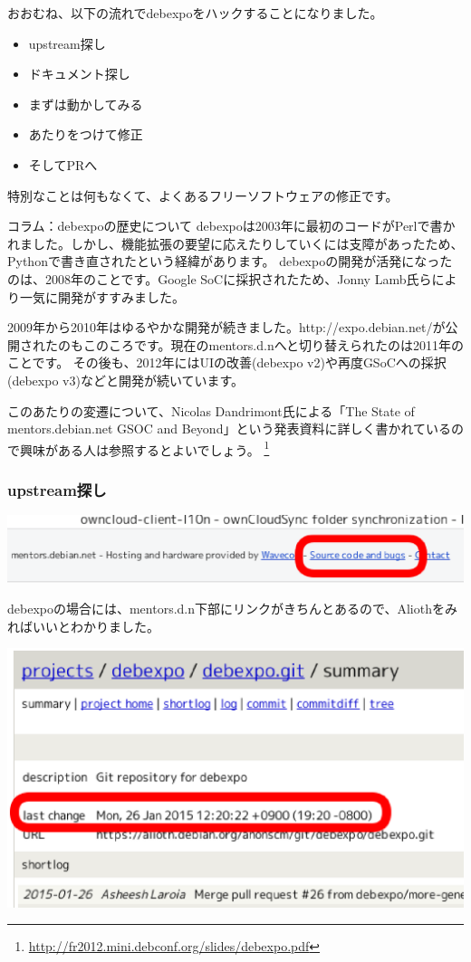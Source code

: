 \documentclass[mingoth,a4paper]{jsarticle}
\begin{document}
おおむね、以下の流れでdebexpoをハックすることになりました。

\begin{itemize}
  \item upstream探し
  \item ドキュメント探し
  \item まずは動かしてみる
  \item あたりをつけて修正
  \item そしてPRへ
\end{itemize}

特別なことは何もなくて、よくあるフリーソフトウェアの修正です。

\begin{itembox}[l]{コラム：debexpoの歴史について}
debexpoは2003年に最初のコードがPerlで書かれました。しかし、機能拡張の要望に応えたりしていくには支障があったため、Pythonで書き直されたという経緯があります。
debexpoの開発が活発になったのは、2008年のことです。Google SoCに採択されたため、Jonny Lamb氏らにより一気に開発がすすみました。

2009年から2010年はゆるやかな開発が続きました。http://expo.debian.net/が公開されたのもこのころです。現在のmentors.d.nへと切り替えられたのは2011年のことです。
その後も、2012年にはUIの改善(debexpo v2)や再度GSoCへの採択(debexpo v3)などと開発が続いています。

このあたりの変遷について、Nicolas Dandrimont氏による「The State of mentors.debian.net GSOC and Beyond」という発表資料に詳しく書かれているので興味がある人は参照するとよいでしょう。
\footnote{\url{http://fr2012.mini.debconf.org/slides/debexpo.pdf}}
\end{itembox}

\subsubsection{upstream探し}

\begin{screen}
\includegraphics[width=0.5\hsize]{image201606/source-code-and-bugs.eps}
\end{screen}

debexpoの場合には、mentors.d.n下部にリンクがきちんとあるので、Aliothをみればいいとわかりました。

\begin{screen}
\includegraphics[width=0.5\hsize]{image201606/last-change-on-alioth.eps}
\end{screen}
\end{document}

